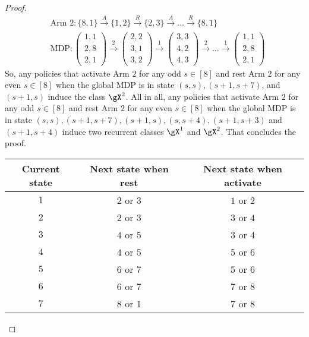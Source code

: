 \begin{proof}
    \begin{align*}
        &\text{Arm 2} : \{8,1\} \overset{A}{\to} \{1,2\} \overset{R}{\to} \{2,3\} \overset{A}{\to} \dots \overset{R}{\to} \{8,1\} \\
        &\text{MDP} : \begin{pmatrix}1,1\\2,8\\2,1\end{pmatrix} \overset{2}{\to} \begin{pmatrix}2,2\\3,1\\3,2\end{pmatrix} \overset{1}{\to} \begin{pmatrix}3,3\\4,2\\4,3\end{pmatrix} \overset{2}{\to} \dots \overset{1}{\to} \begin{pmatrix}1,1\\2,8\\2,1\end{pmatrix}
    \end{align*}
    So, any policies that activate Arm $2$ for any odd $s\in[8]$ and rest Arm $2$ for any even $s\in[8]$ when the global MDP is in state $(s,s), (s+1,s+7)$, and $(s+1,s)$ induce the class $\gX^2$.
    All in all, any policies that activate Arm $2$ for any odd $s\in[8]$ and rest Arm $2$ for any even $s\in[8]$ when the global MDP is in state $(s,s), (s+1,s+7), (s+1,s), (s,s+4), (s+1,s+3)$ and $(s+1,s+4)$ induce two recurrent classes $\gX^1$ and $\gX^2$.
    That concludes the proof.
    \begin{table}[ht]
        \centering
        \begin{tabular}{|c|c|c|}
            \hline
            Current state & Next state when rest & Next state when activate \\\hline 
            $1$   & $2$ or $3$  &  $1$ or $2$ \\
            $2$   & $2$ or $3$  &  $3$ or $4$ \\
            $3$   & $4$ or $5$  &  $3$ or $4$ \\
            $4$   & $4$ or $5$  &  $5$ or $6$ \\
            $5$   & $6$ or $7$  &  $5$ or $6$ \\
            $6$   & $6$ or $7$  &  $7$ or $8$ \\
            $7$   & $8$ or $1$  &  $7$ or $8$ \\

\end{tabular}
\end{table}
\end{proof}
